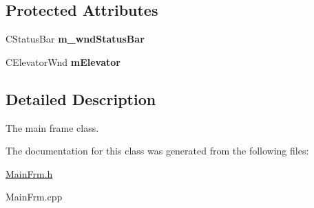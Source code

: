 \subsection*{Protected Attributes}
\begin{DoxyCompactItemize}
\item 
\hypertarget{class_c_main_frame_ac01bafc03aee69cf982e6f029b4db6b0}{C\+Status\+Bar {\bfseries m\+\_\+wnd\+Status\+Bar}}\label{class_c_main_frame_ac01bafc03aee69cf982e6f029b4db6b0}

\item 
\hypertarget{class_c_main_frame_a78d3247b1c3144547bdd9682b35c20a8}{C\+Elevator\+Wnd {\bfseries m\+Elevator}}\label{class_c_main_frame_a78d3247b1c3144547bdd9682b35c20a8}

\end{DoxyCompactItemize}


\subsection{Detailed Description}
The main frame class. 

The documentation for this class was generated from the following files\+:\begin{DoxyCompactItemize}
\item 
\hyperlink{_main_frm_8h}{Main\+Frm.\+h}\item 
Main\+Frm.\+cpp\end{DoxyCompactItemize}
